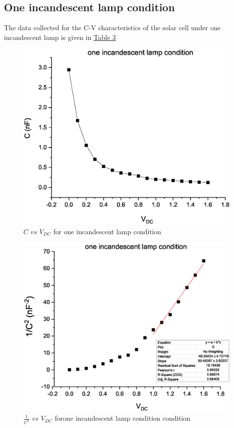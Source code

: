          \subsection{One incandescent lamp condition}
 The data collected for the C-V characteristics of the solar cell under one incandescent lamp is given in \hyperref[tab:3]{Table 3}
		
   \begin{figure}[H]
			\centering
			\includegraphics[width=0.75\columnwidth]{images/GR3.eps}
			\caption{ $C$ $vs$ $V_{DC}$ for one incandescent lamp condition}
			\label{graph:5}
\end{figure}
\begin{figure}[H]
			\centering
			\includegraphics[width=0.75\columnwidth]{images/GR7.eps}
			\caption{$\frac{1}{C^2}$ $vs$ $V_{DC}$ forone incandescent lamp condition condition}
			\label{graph:6}
\end{figure}
